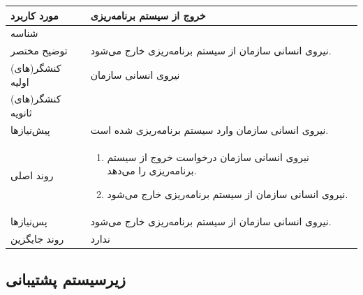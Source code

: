 \begin{table}[H]
	\centering
	\begin{tabular}{|p{3cm}|p{10cm}|}
		\hline
		مورد کاربرد & خروج از سیستم برنامه‌ریزی  \\
		\hline
		شناسه & 
		\stepcounter{usecase_ID}
		\arabic{usecase_ID} \\
		\hline
		توضیح مختصر & نیروی انسانی سازمان از سیستم برنامه‌ریزی خارج می‌شود. \\
		\hline
		کنشگر(های) اولیه & نیروی انسانی سازمان  \\
		\hline
		کنشگر(های) ثانویه &  \\
		\hline
		پیش‌نیازها & نیروی انسانی سازمان وارد سیستم برنامه‌ریزی شده است. \\
		\hline
		
		
		روند اصلی &
		\begin{enumerate}[topsep=0cm,leftmargin=0.5cm]
			\item نیروی انسانی سازمان درخواست خروج از سیستم برنامه‌ریزی را می‌دهد.
			\item نیروی انسانی سازمان از سیستم برنامه‌ریزی خارج می‌شود.
		\end{enumerate} \\
		
		\hline
		
		پس‌نیازها & نیروی انسانی سازمان از سیستم برنامه‌ریزی خارج می‌شود. \\
		\hline
		روند جایگزین & ندارد \\
		\hline
	\end{tabular}
\end{table}

\subsection{زیرسیستم پشتیبانی}

